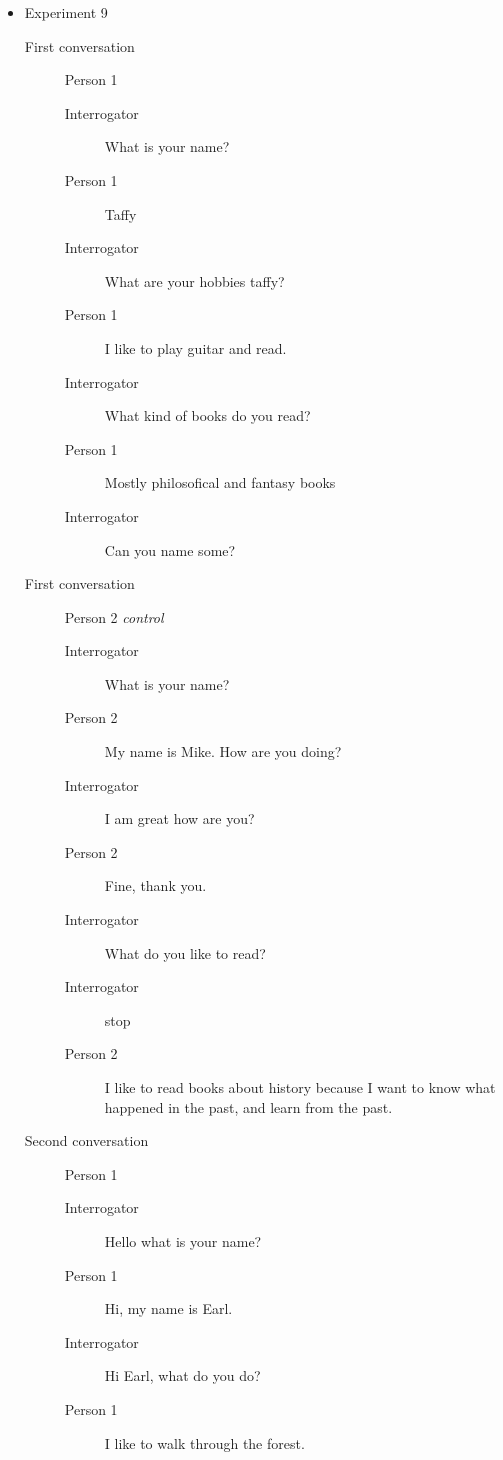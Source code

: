 \begin{itemize}
   \item Experiment 9
      \begin{description}
         \item [First conversation] Person 1
            \begin{description}
               \item [Interrogator] What is your name?
               \item [Person 1] Taffy
               \item [Interrogator] What are your hobbies taffy?
               \item [Person 1] I like to play guitar and read.
               \item [Interrogator] What kind of books do you read?
               \item [Person 1] Mostly philosofical and fantasy books
               \item [Interrogator] Can you name some?
            \end{description}
         \item [First conversation] Person 2 \textit{control}
            \begin{description}
               \item [Interrogator] What is your name?
               \item [Person 2] My name is Mike. How are you doing?
               \item [Interrogator] I am great how are you?
               \item [Person 2] Fine, thank you.
               \item [Interrogator] What do you like to read?
               \item [Interrogator] stop
               \item [Person 2] I like to read books about history because I want to know what happened in the past, and learn from the past.
            \end{description}
         \item [Second conversation] Person 1
            \begin{description}
               \item [Interrogator] Hello what is your name?
               \item [Person 1] Hi, my name is Earl.
               \item [Interrogator] Hi Earl, what do you do?
               \item [Person 1] I like to walk through the forest.

\end{description}
\end{description}
\end{itemize}
